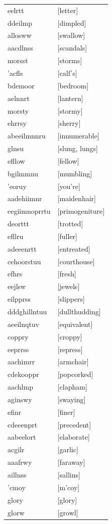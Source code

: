 \documentclass{article}
\begin{document}
\begin{tabular}{ll}
eelrtt & [letter] \\
ddeilmp & [dimpled] \\
allosww & [swallow] \\
aacdlnss & [scandals] \\
morsst & [storms] \\
'acfls & [calf's] \\
bdemoor & [bedroom] \\
aelnnrt & [lantern] \\
morsty & [stormy] \\
ehrrsy & [sherry] \\
abeeilmnnru & [innumerable] \\
glnsu & [slung, lungs] \\
efllow & [fellow] \\
bgilmmnu & [mumbling] \\
'eoruy & [you're] \\
aadehiimnr & [maidenhair] \\
eegiimnoprrtu & [primogeniture] \\
deorttt & [trotted] \\
efllru & [fuller] \\
adeeenrtt & [entreated] \\
cehoorstuu & [courthouse] \\
efhrs & [fresh] \\
eejlsw & [jewels] \\
eilpprss & [slippers] \\
dddghillntuu & [dullthudding] \\
aeeilnqtuv & [equivalent] \\
coppry & [croppy] \\
eeprrss & [repress] \\
aachimrr & [armchair] \\
cdekooppr & [popcorked] \\
aachlmp & [clapham] \\
aginswy & [swaying] \\
efinr & [finer] \\
cdeeenprt & [precedent] \\
aabeelort & [elaborate] \\
acgilr & [garlic] \\
aaafrwy & [faraway] \\
aillnss & [sallins] \\
'cmoy & [m'coy] \\
glory & [glory] \\
glorw & [growl] \\

\end{tabular}
\end{document}
